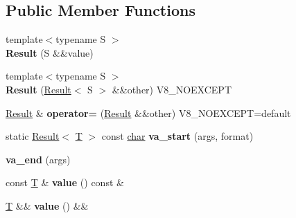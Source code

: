 \subsection*{Public Member Functions}
\begin{DoxyCompactItemize}
\item 
\mbox{\label{classv8_1_1internal_1_1wasm_1_1Result_a99160a0cca780ad825d6910908d6e092}} 
{\footnotesize template$<$typename S $>$ }\\{\bfseries Result} (S \&\&value)
\item 
\mbox{\label{classv8_1_1internal_1_1wasm_1_1Result_a0d674054a99e0856ec9137269da29a6f}} 
{\footnotesize template$<$typename S $>$ }\\{\bfseries Result} (\mbox{\hyperlink{classv8_1_1internal_1_1wasm_1_1Result}{Result}}$<$ S $>$ \&\&other) V8\+\_\+\+N\+O\+E\+X\+C\+E\+PT
\item 
\mbox{\label{classv8_1_1internal_1_1wasm_1_1Result_a0f71d8a3076b72dac489b1c70e0fcd3c}} 
\mbox{\hyperlink{classv8_1_1internal_1_1wasm_1_1Result}{Result}} \& {\bfseries operator=} (\mbox{\hyperlink{classv8_1_1internal_1_1wasm_1_1Result}{Result}} \&\&other) V8\+\_\+\+N\+O\+E\+X\+C\+E\+PT=default
\item 
\mbox{\label{classv8_1_1internal_1_1wasm_1_1Result_a6e9aaeca8c8dc6b921d5e14850aff60c}} 
static \mbox{\hyperlink{classv8_1_1internal_1_1wasm_1_1Result}{Result}}$<$ \mbox{\hyperlink{classv8_1_1internal_1_1torque_1_1T}{T}} $>$ const \mbox{\hyperlink{classchar}{char}} {\bfseries va\+\_\+start} (args, format)
\item 
\mbox{\label{classv8_1_1internal_1_1wasm_1_1Result_afc0cd5c1c790ca06526a24c2c3659c3d}} 
{\bfseries va\+\_\+end} (args)
\item 
\mbox{\label{classv8_1_1internal_1_1wasm_1_1Result_a307af8b5af132a63ed8c43de7f7f9f3b}} 
const \mbox{\hyperlink{classv8_1_1internal_1_1torque_1_1T}{T}} \& {\bfseries value} () const \&
\item 
\mbox{\label{classv8_1_1internal_1_1wasm_1_1Result_af74bf36e5fa617fb0be57ba8c1e667be}} 
\mbox{\hyperlink{classv8_1_1internal_1_1torque_1_1T}{T}} \&\& {\bfseries value} () \&\&
\end{DoxyCompactItemize}
